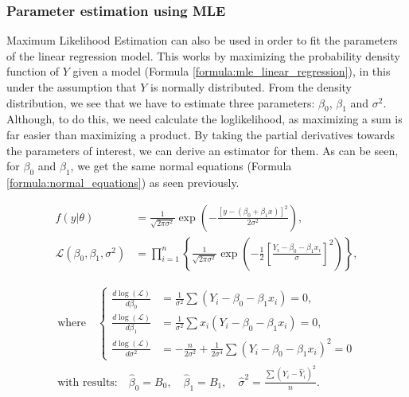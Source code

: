 \subsubsection{Parameter estimation using MLE}

Maximum Likelihood Estimation can also be used in order to fit the parameters of the linear regression model.
This works by maximizing the probability density function of $Y$ given a model (Formula \ref{formula:mle_linear_regression}), in this under the assumption that $Y$ is normally distributed.
From the density distribution, we see that we have to estimate three parameters: $\beta_0$, $\beta_1$ and $\sigma^2$.
Although, to do this, we need calculate the loglikelihood, as maximizing a sum is far easier than maximizing a product.
By taking the partial derivatives towards the parameters of interest, we can derive an estimator for them.
As can be seen, for $\beta_0$ and $\beta_1$, we get the same normal equations (Formula \ref{formula:normal_equations}) as seen previously.

\begin{equation}
    \begin{aligned}
        f(y|\theta) &= \frac{1}{\sqrt{2\pi\sigma^2}} \exp\left(- \frac{\left[y - (\beta_0 + \beta_1x)\right]^2}{2\sigma^2}\right), \\[10pt]
        \mathcal{L}(\beta_0, \beta_1, \sigma^2) &= \prod_{i=1}^n \left\{ \frac{1}{\sqrt{2\pi\sigma^2}} \exp\left(-\frac{1}{2} \left[\frac{Y_i-\beta_0-\beta_1x_i}{\sigma}\right]^2\right)\right\},
    \end{aligned}
    \label{formula:mle_linear_regression}
\end{equation}

\begin{equation}
    \begin{aligned}
    \text{where} \quad 
    \left\{
    \begin{aligned}
        \frac{d \log (\mathcal{L})}{d\beta_0} &= \frac{1}{\sigma^2} \sum\left(Y_i - \beta_0 - \beta_1x_i\right) = 0, \\
        \frac{d \log (\mathcal{L})}{d\beta_1} &= \frac{1}{\sigma^2} \sum x_i \left(Y_i - \beta_0 - \beta_1x_i\right) = 0, \\
        \frac{d \log (\mathcal{L})}{d\sigma^2} &= -\frac{n}{2\sigma^2} + \frac{1}{2\sigma^4} \sum \left(Y_i - \beta_0 - \beta_1 x_i\right)^2 = 0
    \end{aligned}
    \right. \\[10pt]
    \text{with results:} \quad \hat{\beta}_0 = B_0, \quad \hat{\beta}_1 = B_1, \quad \hat{\sigma}^2 = \frac{\sum(Y_i - \hat{Y}_i)^2}{n}.
    \end{aligned}
\end{equation}
    
